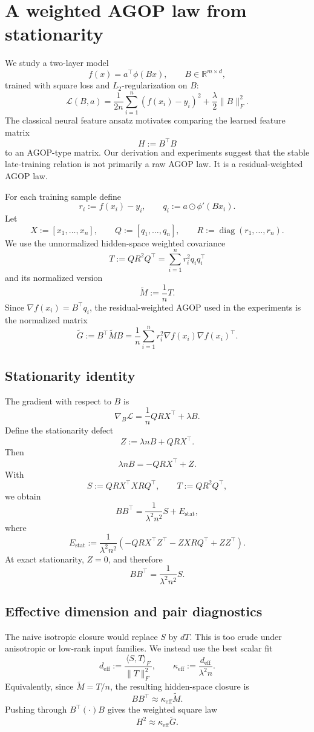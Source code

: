 \section{A weighted AGOP law from stationarity}
\label{sec:weighted-law}

We study a two-layer model
\[
f(x)=a^\top \phi(Bx),
\qquad
B\in\mathbb R^{m\times d},
\]
trained with square loss and \(L_2\)-regularization on \(B\):
\[
\mathcal L(B,a)
=
\frac{1}{2n}\sum_{i=1}^n (f(x_i)-y_i)^2
+
\frac{\lambda}{2}\|B\|_F^2.
\]
The classical neural feature ansatz motivates comparing the learned feature
matrix
\[
H:=B^\top B
\]
to an AGOP-type matrix. Our derivation and experiments suggest that the stable
late-training relation is not primarily a raw AGOP law. It is a
residual-weighted AGOP law.

For each training sample define
\[
r_i := f(x_i)-y_i,
\qquad
q_i := a\odot \phi'(Bx_i).
\]
Let
\[
X := [x_1,\ldots,x_n],
\qquad
Q := [q_1,\ldots,q_n],
\qquad
R := \operatorname{diag}(r_1,\ldots,r_n).
\]
We use the unnormalized hidden-space weighted covariance
\[
T:=QR^2Q^\top
=
\sum_{i=1}^n r_i^2 q_iq_i^\top
\]
and its normalized version
\[
\widetilde M:=\frac1n T.
\]
Since \(\nabla f(x_i)=B^\top q_i\), the residual-weighted AGOP used in the
experiments is the normalized matrix
\[
\widetilde G
:=
B^\top \widetilde M B
=
\frac1n\sum_{i=1}^n r_i^2 \nabla f(x_i)\nabla f(x_i)^\top.
\]

\subsection{Stationarity identity}

The gradient with respect to \(B\) is
\[
\nabla_B\mathcal L
=
\frac1n QRX^\top + \lambda B.
\]
Define the stationarity defect
\[
Z := \lambda n B + QRX^\top.
\]
Then
\[
\lambda n B = -QRX^\top + Z.
\]
With
\[
S:=QRX^\top XRQ^\top,
\qquad
T:=QR^2Q^\top,
\]
we obtain
\[
BB^\top
=
\frac{1}{\lambda^2 n^2}S
+
E_{\mathrm{stat}},
\]
where
\[
E_{\mathrm{stat}}
:=
\frac{1}{\lambda^2 n^2}
\left(
-QRX^\top Z^\top
-
ZXRQ^\top
+
ZZ^\top
\right).
\]
At exact stationarity, \(Z=0\), and therefore
\[
BB^\top
=
\frac{1}{\lambda^2 n^2}S.
\]

\subsection{Effective dimension and pair diagnostics}

The naive isotropic closure would replace \(S\) by \(dT\). This is too crude
under anisotropic or low-rank input families. We instead use the best scalar
fit
\[
d_{\mathrm{eff}}
:=
\frac{\langle S,T\rangle_F}{\|T\|_F^2},
\qquad
\kappa_{\mathrm{eff}}
:=
\frac{d_{\mathrm{eff}}}{\lambda^2 n}.
\]
Equivalently, since \(\widetilde M=T/n\), the resulting hidden-space closure is
\[
BB^\top \approx \kappa_{\mathrm{eff}}\widetilde M.
\]
Pushing through \(B^\top(\cdot)B\) gives the weighted square law
\[
H^2
\approx
\kappa_{\mathrm{eff}}\widetilde G.
\]

